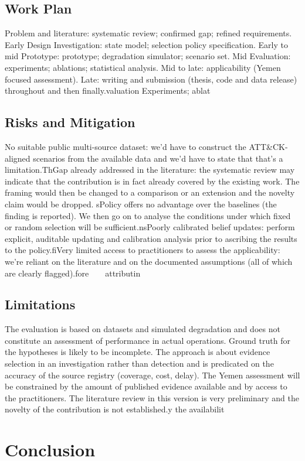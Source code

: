 \documentclass[a4paper,11pt]{article}
\begin{document}
\subsection{Work Plan}
Problem and literature: systematic review; confirmed gap; refined requirements. Early Design Investigation: state model; selection policy specification. Early to mid Prototype: prototype; degradation simulator; scenario set. Mid Evaluation: experiments; ablations; statistical analysis. Mid to late: applicability (Yemen focused assessment). Late: writing and submission (thesis, code and data release) throughout and then finally.valuation Experiments; ablat\subsection{Risks and Mitigation}
No suitable public multi-source dataset: we'd have to construct the ATT\&CK-aligned scenarios from the available data and we'd have to state that that's a limitation.ThGap already addressed in the literature: the systematic review may indicate that the contribution is in fact already covered by the existing work. The framing would then be changed to a comparison or an extension and the novelty claim would be dropped. sPolicy offers no advantage over the baselines (the finding is reported). We then go on to analyse the conditions under which fixed or random selection will be sufficient.nsPoorly calibrated belief updates: perform explicit, auditable updating and calibration analysis prior to ascribing the results to the policy.fiVery limited access to practitioners to assess the applicability: we're reliant on the literature and on the documented assumptions (all of which are clearly flagged).fore     attributin\subsection{Limitations}
The evaluation is based on datasets and simulated degradation and does not constitute an assessment of performance in actual operations. Ground truth for the hypotheses is likely to be incomplete. The approach is about evidence selection in an investigation rather than detection and is predicated on the accuracy of the source registry (coverage, cost, delay). The Yemen assessment will be constrained by the amount of published evidence available and by access to the practitioners. The literature review in this version is very preliminary and the novelty of the contribution is not established.y the availabilit\section{Conclusion}
\end{document}
